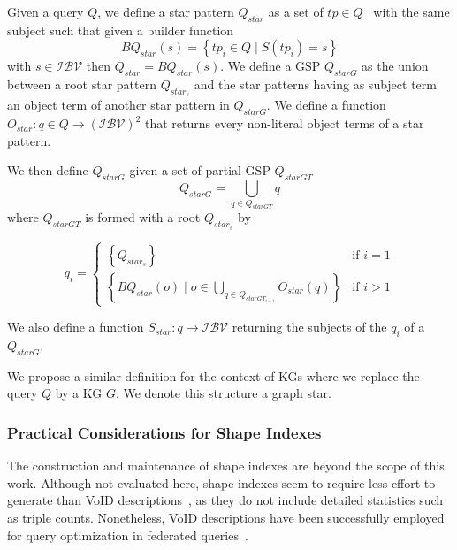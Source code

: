 \begin{definition}\label{def:starPattern}
   Given a query $Q$, we define a star pattern $Q_{star}$ as a set of $tp \in Q$~\cite{Karim2020} with the same subject such that 
   given a builder function 
   \begin{equation}
       BQ_{star}(s) = \left\{ tp_i \in Q \mid S(tp_i) = s \right\}
   \end{equation}
   with $s \in \mathcal{I}\mathcal{B}\mathcal{V}$ then $Q_{star} = BQ_{star}(s)$.
   We define a GSP $Q_{starG}$ as the union between a root star pattern $Q_{star_s}$
   and the star patterns having as subject term an object term of another star pattern in $Q_{starG}$.
   We define a function 
   $O_{star}: q \in Q \rightarrow  (\mathcal{I}\mathcal{B}\mathcal{V})^2$
   that returns every non-literal object terms of a star pattern.

   We then define $Q_{starG}$ given a  set of partial GSP $Q_{starGT}$
   \begin{equation}
      Q_{starG} = \bigcup_{q \in Q_{starGT}} q
   \end{equation}
   where $Q_{starGT}$ is formed with a root $Q_{star_s}$ by

   \begin{equation}
           q_i =
       \begin{cases}
         \left\{ Q_{star_s} \right\} & \text{if } i = 1 \\
           \left\{ BQ_{star}(o) \mid o \in \bigcup_{q \in Q_{starGT_{i-1}}} O_{star}(q) \right\} & \text{if } i>1
       \end{cases}
   \end{equation}

   We also define a function  
   $S_{star}: q \rightarrow  \mathcal{I}\mathcal{B}\mathcal{V}$
   returning the subjects of the $q_i$ of a $Q_{starG}$.

   We propose a similar definition for the context of KGs where we replace the query $Q$ by a KG $G$. 
   We denote this structure a graph star.
   
\end{definition}

\subsubsection{Practical Considerations for Shape Indexes}

The construction and maintenance of shape indexes are beyond the scope of this work. 
Although not evaluated here, shape indexes seem to require less effort to generate than VoID descriptions~\cite{Boehm2011}, as they do not include detailed statistics such as triple counts. 
Nonetheless, VoID descriptions have been successfully employed for query optimization in federated queries~\cite{Montoya2017}. 

